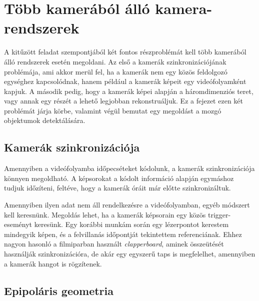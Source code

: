 \chapter{Több kamerából álló kamera-rendszerek \label{chapter2}}

A kitűzött feladat szempontjából két fontos részproblémát kell több kamerából álló rendszerek esetén megoldani. Az első a kamerák szinkronizációjának problémája, ami akkor merül fel, ha a kamerák nem egy közös feldolgozó egységhez kapcsolódnak, hanem például a kamerák képeit egy videófolyamként kapjuk. A második pedig, hogy a kamerák képei alapján a háromdimenziós teret, vagy annak egy részét a lehető legjobban rekonstruáljuk. Ez a fejezet ezen két problémát járja körbe, valamint végül bemutat egy megoldást a mozgó objektumok detektálására.


\section{Kamerák szinkronizációja}


Amennyiben a videófolyamba időpecséteket kódolunk, a kamerák szinkronizációja könnyen megoldható. A képsorokat a kódolt információ alapján egymáshoz tudjuk időzíteni, feltéve, hogy a kamerák óráit már előtte szinkronizáltuk.

Amennyiben ilyen adat nem áll rendelkezésre a videófolyamban, egyéb módszert kell keresnünk. Megoldás lehet, ha a kamerák képsorain egy közös trigger-eseményt keresünk. Egy korábbi munkám során \cite{onlab-1} egy lézerpontot kerestem mindegyik képen, és a felvillanás időpontját tekintettem referenciának. Ehhez nagyon hasonló a filmiparban használt \textit{clapperboard}, aminek összeütését használják szinkronizációra, de akár egy egyszerű taps is megfelelhet, amennyiben a kamerák hangot is rögzítenek.


\section{Epipoláris geometria \label{sec:epipolar}}

